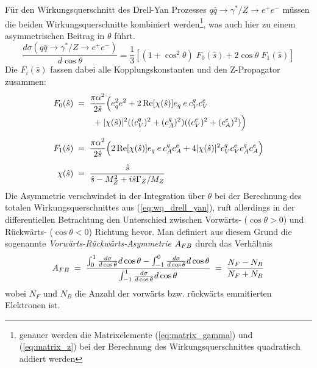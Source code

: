 Für den Wirkungsquerschnitt des Drell-Yan Prozesses $q\bar q \rightarrow
\gamma^*/Z \rightarrow e^+e^-$ müssen die beiden Wirkungsquerschnitte
kombiniert werden\footnote{genauer werden die Matrixelemente
(\ref{eq:matrix_gamma}) und (\ref{eq:matrix_z}) bei der Berechnung des
Wirkungsquerschnittes quadratisch addiert werden}, was auch hier zu einem 
asymmetrischen Beitrag in $\theta$ führt.
\begin{equation}
    \frac{d\sigma(q\bar q\rightarrow\gamma^*/Z\rightarrow e^+e^-)}{d\cos\theta}
        = \frac{1}{3}
          \left[
              (1+\cos^2\theta) \; F_0(\hat s)
              + 2\cos\theta \; F_1(\hat s)
          \right]
    \label{eq:wq_drell_yan}
\end{equation}
Die $F_i(\hat s)$ fassen dabei alle Kopplungskonstanten und den Z-Propagator
zusammen:
\begin{align}
    F_0(\hat s) \; &= \;
        \frac{\pi \alpha^2}{2 \hat s}
        \Bigl(
            e_q^2 e^2 + 2 \operatorname{Re}[\chi(\hat s)] e_q \:e\: c_V^q c_V^e
            \nonumber \\ & \qquad
            + |\chi(\hat s)|^2 ((c_V^q)^2+(c_A^q)^2)((c_V^e)^2+(c_A^e)^2)
        \Bigr)
        \\[5pt]
    F_1(\hat s) \; &= \;
        \frac{\pi \alpha^2}{2 \hat s}
        \Bigl(
            2\operatorname{Re}[\chi(\hat s)] e_q \:e\: c_A^q c_A^e
            + 4|\chi(\hat s)|^2 c_V^q c_V^e c_A^q c_A^e
        \Bigr)
        \\[5pt]
    \chi(\hat s) \; &= \;
        \frac{\hat s}{\hat s - M_Z^2 + i\hat s \Gamma_Z/M_Z}
\end{align}
Die Asymmetrie verschwindet in der Integration über $\theta$ bei der
Berechnung des totalen Wirkungsquerschnittes aus (\ref{eq:wq_drell_yan}), ruft
allerdings in der differentiellen Betrachtung den Unterschied zwischen
Vorwärts- ($\cos\theta > 0$) und Rückwärts- ($\cos\theta < 0$) Richtung hevor. 
Man definiert aus diesem Grund die sogenannte
\textit{Vorwärts-Rückwärts-Asymmetrie} $A_{FB}$ durch das Verhältnis
\begin{equation}
    A_{FB} \;=\; \frac{ \int_0^1    \frac{d\sigma}{d\cos\theta} d\cos\theta
                    - \int_{-1}^0 \frac{d\sigma}{d\cos\theta} d\cos\theta
                    }{\int_{-1}^1 \frac{d\sigma}{d\cos\theta} d\cos\theta}
         \;=\; \frac{N_F - N_B}{N_F + N_B}
\end{equation}
wobei $N_F$ und $N_B$ die Anzahl der vorwärts bzw. rückwärts emmitierten
Elektronen ist.



